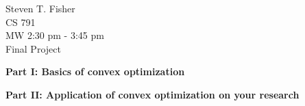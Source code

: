 \documentclass{article}
\newcommand{\src}[1]{}
\begin{document}
	\begin{flushright}
		Steven T. Fisher\\
		CS 791\\
		MW 2:30 pm - 3:45 pm\\
		Final Project
	\end{flushright}
        \renewcommand\qedsymbol{}
        
\textbf{Part I: Basics of convex optimization}
\src{projq1}
\newpage
\src{projq2}
\newpage
\src{projq3}
\newpage
\src{projq4}
\newpage
\src{projq5}
\newpage
\textbf{Part II: Application of convex optimization on your research}
\src{part2}

\end{document}
